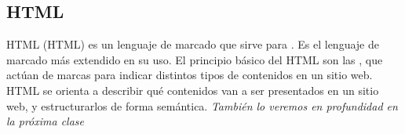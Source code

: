 
\subsection{HTML}


\begin{frame}{HTML}
   (HTML) es un lenguaje de marcado que sirve para
  .
  \jump
  Es el lenguaje de marcado más extendido en su uso.
  \jump
  El principio básico del HTML son las , que actúan de marcas para
  indicar distintos tipos de contenidos en un sitio web.
  \jump
  HTML se orienta a describir qué contenidos van a ser presentados en un sitio
  web, y estructurarlos de forma semántica.
  \jump
  \textit{También lo veremos en profundidad en la próxima clase}
\end{frame}
